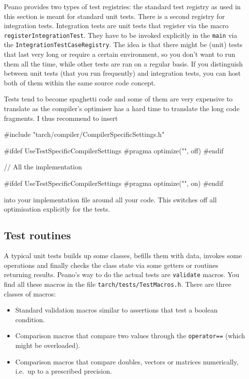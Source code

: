 \begin{remark}
  Peano provides two types of test registries: the standard test registry as
  used in this section is meant for standard unit tests. There is a second
  registry for integration tests. Integration tests are unit tests that register
  via the macro \texttt{registerIntegrationTest}. They have to be invoked
  explicitly in the \texttt{main} via the \texttt{IntegrationTestCaseRegistry}. 
  The idea is that there might be (unit) tests that last very long or require a
  certain environment, so you don't want to run them all the time, while other
  tests are ran on a regular basis. If you distinguish between unit tests (that
  you run frequently) and integration tests, you can host both of them within
  the same source code concept.
\end{remark}




\begin{remark}
  Tests tend to become spaghetti code and some of them are very expensive to
  translate as the compiler's optimiser has a hard time to translate the long
  code fragments.
  I thus recommend to insert
  \begin{code}
#include "tarch/compiler/CompilerSpecificSettings.h"

#ifdef UseTestSpecificCompilerSettings
#pragma optimize("", off)
#endif

// All the implementation

#ifdef UseTestSpecificCompilerSettings
#pragma optimize("", on)
#endif
  \end{code}
  into your implementation file around all your code. This switches off all
  optimisation explicitly for the tests.
\end{remark}


\subsection{Test routines}

A typical unit tests builds up some classes, befills them with data, invokes
some operations and finally checks the class state via some getters or routines
returning results.
Peano's way to do the actual tests are \texttt{validate} macros.
You find all these macros in the file \texttt{tarch/tests/TestMacros.h}.
There are three classes of macros:

\begin{itemize}
  \item Standard validation macros similar to assertions that test a boolean
  condition.
  \item Comparison macros that compare two values through the
  \texttt{operator==} (which might be overloaded).
  \item Comparison macros that compare doubles, vectors or matrices numerically,
  i.e.~up to a prescribed precision.
\end{itemize}

